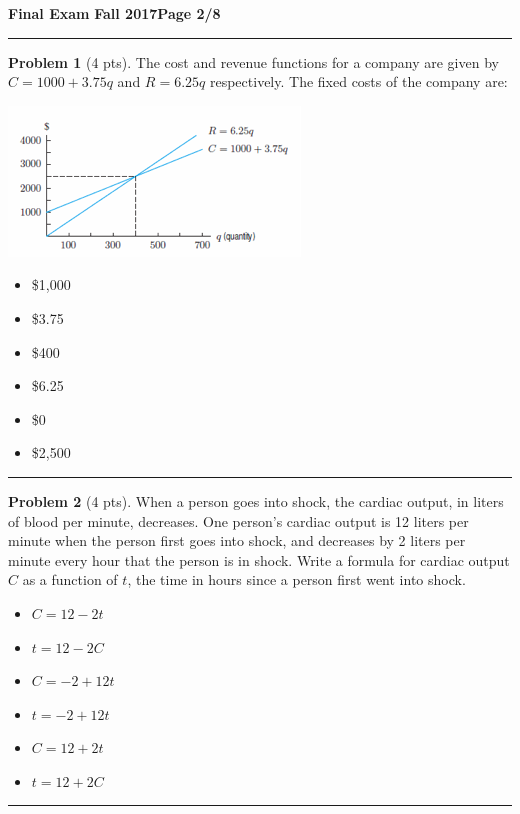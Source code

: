\documentclass[12pt]{article}
\makeatletter
\theoremstyle{definition}
\newtheorem{problem}{Problem}
\newcommand*{\radiobutton}{%
  \@ifstar{\@radiobutton0}{\@radiobutton1}%
}
\newcommand*{\@radiobutton}[1]{%
  \begin{tikzpicture}
    \pgfmathsetlengthmacro\radius{height("X")/2}
    \draw[radius=\radius] circle;
    \ifcase#1 \fill[radius=.6*\radius] circle;\fi
  \end{tikzpicture}%
}
\makeatother
\begin{document}
\hfill{\large\bf Final Exam}\hfill{\large\bf
  Fall 2017}\hfill{\large\bf Page 2/8}\hrule

\bigskip

\begin{problem}[4 pts]
The cost and revenue functions for a company are given by $C=1000+3.75q$ and $R=6.25q$ respectively.
The fixed costs of the company are:
\begin{multicols}{2}
\begin{center}
\includegraphics[width=\linewidth]{1graph1.png}
\end{center}
\begin{itemize}
\item[\radiobutton] \$1,000
\item[\radiobutton] \$3.75
\item[\radiobutton] \$400
\item[\radiobutton] \$6.25
\item[\radiobutton] \$0
\item[\radiobutton] \$2,500
\end{itemize}
\end{multicols}
\end{problem}

\hrule
\begin{problem}[4 pts]
When a person goes into shock, the cardiac output, in liters of blood per minute, decreases. One person’s cardiac output is 12 liters per minute when the person first goes into shock, and decreases by 2 liters per minute every hour that the person is in shock. Write a formula for cardiac output $C$ as a function of $t$, the time in hours since a person first went into shock.
\begin{itemize}
\item[\radiobutton] $C = 12 - 2t$
\item[\radiobutton] $t = 12 - 2C$
\item[\radiobutton] $C = -2 + 12t$
\item[\radiobutton] $t = -2 + 12t$
\item[\radiobutton] $C = 12 + 2t$
\item[\radiobutton] $t = 12 + 2C$
\end{itemize}
\end{problem}
\hrule
\end{document}
